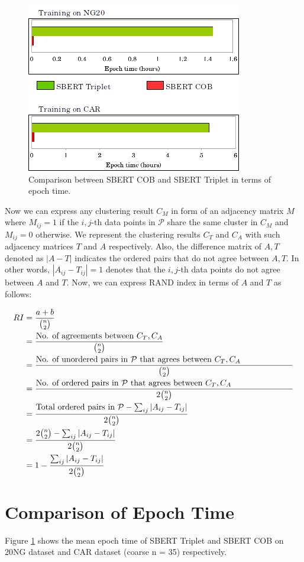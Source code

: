 \documentclass[11pt,a4paper]{article}
\begin{document}
\begin{figure}[t]
    \centering
    \includegraphics[scale=0.75]{acl-ijcnlp2021-templates/epoch_time.png}
    \caption{Comparison between SBERT COB and SBERT Triplet in terms of epoch time.}
    \label{fig:train}
\end{figure}
Now we can express any clustering result $C_M$ in form of an adjacency matrix $M$ where $M_{ij}=1$ if the $i,j$-th data points in $\mathcal{P}$ share the same cluster in $C_M$ and $M_{ij}=0$ otherwise. We represent the clustering results $C_T$ and $C_A$ with such adjacency matrices $T$ and $A$ respectively. Also, the difference matrix of $A,T$ denoted as $|A-T|$ indicates the ordered pairs that do not agree between $A,T$. In other words, $|A_{ij}-T_{ij}|=1$ denotes that the $i,j$-th data points do not agree between $A$ and $T$. Now, we can express RAND index in terms of $A$ and $T$ as follows:

\begin{align*}
    RI &= \frac{a+b}{\binom{n}{2}} \\
    &= \frac{\text{No. of agreements between } C_T,C_A}{\binom{n}{2}} \\
    &= \frac{\parbox{0.9\linewidth}{No. of unordered pairs in $\mathcal{P}$ that agrees between $C_T,C_A$}}{\binom{n}{2}} \\
    &= \frac{\parbox{0.9\linewidth}{No. of ordered pairs in $\mathcal{P}$ that agrees between $C_T,C_A$}}{2\binom{n}{2}} \\
    &= \frac{\text{Total ordered pairs in $\mathcal{P}$}-\sum_{ij} |A_{ij}-T_{ij}|}{2\binom{n}{2}} \\
    &= \frac{2\binom{n}{2}-\sum_{ij} |A_{ij}-T_{ij}|}{2\binom{n}{2}} \\
    &= 1-\frac{\sum_{ij} |A_{ij}-T_{ij}|}{2\binom{n}{2}}
\end{align*}

\section{Comparison of Epoch Time} 
Figure \ref{fig:train} shows the mean epoch time of SBERT Triplet and SBERT COB on 20NG dataset and CAR dataset (coarse n = 35) respectively.
\end{document}
